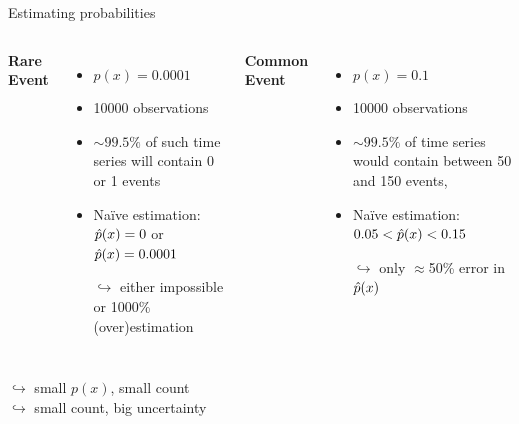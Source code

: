 \begin{frame}{Estimating probabilities}
\begin{columns}[T]
\textbf{Rare Event} %
\begin{itemize}
  \item $p(x) = 0.0001$
  \item 10000 observations
  \item $\sim 99.5\%$ of such time series will contain 0 or 1 events
  \item Na\"ive estimation: $\hat{p}(x) = 0$ or $\hat{p}(x)=0.0001$
  \item[$\hookrightarrow$] either impossible or 1000\% (over)estimation
\end{itemize}
\textbf{Common Event} %
\begin{itemize}
  \item $p(x)=0.1$
  \item 10000 observations
  \item $\sim 99.5\%$ of time series would contain between 50 and 150 events,
  \item Na\"ive estimation: $0.05< \hat{p}(x) <0.15$
  \item[]
  \item[$\hookrightarrow$] only $\approx$50\% error in $\hat{p}(x)$
\end{itemize}
\end{columns}
\vspace{2em}
 \centering
$\hookrightarrow$ small $p(x)$, small count \\
$\hookrightarrow$ small count, big uncertainty
\end{frame}


